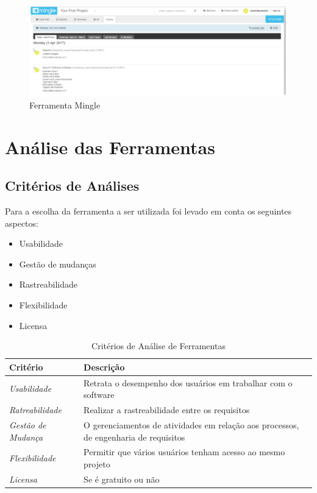 	\begin{figure}[!h]
		 \centering
		 \includegraphics[keepaspectratio=true,scale=0.75]{figuras/mingle2.eps}
		 \caption{Ferramenta Mingle}
		 \label{fig14}
	\end{figure}

\section{Análise das Ferramentas}
 		\subsection{Critérios de Análises}
		Para a escolha da ferramenta a ser utilizada foi levado em conta os seguintes aspectos:

		\begin{itemize}
			\item Usabilidade
			\item Gestão de mudanças
			\item Rastreabilidade
			\item Flexibilidade
			\item Licensa
		\end{itemize}

\begin{table}[!h]
\centering
	\caption{Critérios de Análise de Ferramentas}
	\label{my-label}
	\begin{tabular}{|l|l|}
	\hline
	\textbf{Critério}          & \textbf{Descrição}                                                                   \\ \hline
	\textit{Usabilidade}       & Retrata o desempenho dos usuários em trabalhar com o software                        \\ \hline
	\textit{Ratreabilidade}    & Realizar a rastreabilidade entre os requisitos                                       \\ \hline
	\textit{Gestão de Mudança} &\parbox[t]{7cm}{O gerenciamentos de atividades em relação aos processos, de engenharia de requisitos} \\ \hline
	\textit{Flexibilidade}     & Permitir que vários usuários tenham acesso ao mesmo projeto                          \\ \hline
	\textit{Licensa}           & Se é gratuito ou não                                                                 \\ \hline
	\end{tabular}
\end{table}


